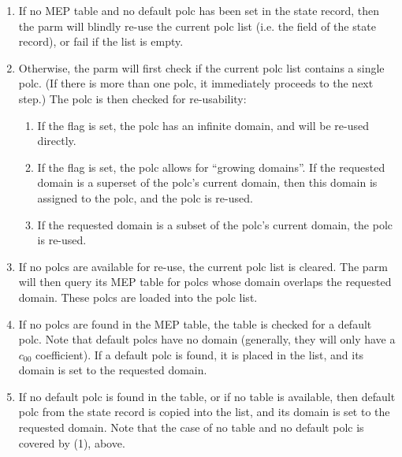 \documentclass[10pt]{article}
\begin{document}
  \begin{enumerate}
  
  \item If no MEP table and no default polc has been set in the state record,
    then the parm will blindly re-use the current polc list (i.e. the
     field of the state record), or fail if the list is empty. 

  \item Otherwise, the parm will first check if the current polc list contains
    a single polc. (If there is more than one polc, it immediately proceeds to
    the next step.) The polc is then checked for re-usability:
    
    \begin{enumerate}
    
    \item If the  flag is set, the polc has an infinite domain, 
      and will be re-used directly.
      
    \item If the  flag is set, the polc allows for ``growing
      domains''. If the requested domain is a superset of the polc's current
      domain, then this domain is assigned to the polc, and the polc is
      re-used. 

    \item If the requested domain is a subset of the polc's current domain, the
      polc is re-used.

    \end{enumerate}

  \item If no polcs are available for re-use, the current polc list is cleared.
    The parm will then query its MEP table for polcs whose domain overlaps
    the requested domain. These polcs are loaded into the polc list.

  \item If no polcs are found in the MEP table, the table is checked for a
    default polc. Note that default polcs have no domain (generally, they will
    only have a $c_{00}$ coefficient). If a default polc is found, it is placed
    in the list, and its domain is set to the requested domain.

  \item If no default polc is found in the table, or if no table is available,
    then default polc from the state record is copied into the list, and its
    domain is set to the requested domain. Note that the case of no table and
    no default polc is covered by (1), above.

  \end{enumerate}
  
\end{document}
